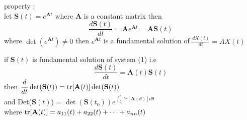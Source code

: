\documentclass[]{article}
\begin{document}
property : 
\\
let $\displaystyle \mathbf{S}(t) = e^{\mathbf{A}t}$ where $\mathbf{A}$ is a constant matrix then
\[
    \frac{d\mathbf{S}(t)}{dt} = \mathbf{A}e^{\mathbf{A}t} = \mathbf{A}\mathbf{S}(t)
\]
where $\det(e^{\mathbf{A}t})\neq 0$
then $e^{\mathbf{A}t}$ is a fundamental solution of $\displaystyle \frac{dX(t)}{dt} = AX(t)$
\newpage
\begin{theorem}[]
    if $\mathbf{S}(t)$ is fundamental solution of system (1) i.e 
    \[
        \frac{d\mathbf{S}(t)}{dt} = \mathbf{A}(t)\mathbf{S}(t)
    \]
    then $\displaystyle \frac{d}{dt}\det(\mathbf{S}(t)) = \trace[\mathbf{A}(t)] \det(\mathbf{S}(t))$
    \\
    and Det($\mathbf{S}(t)$) = $\det(\mathbf{S}(t_0))e^{\int_{t_0}^{t}tr[\mathbf{A}(\theta)]d\theta}$
    \\
    where $\trace[\mathbf{A}(t)] = a_{11}(t) + a_{22}(t) + \dots + a_{nn}(t)$
\end{theorem}
\end{document}
